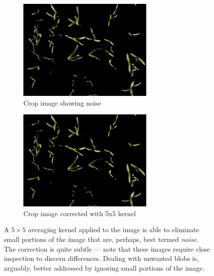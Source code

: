 \documentclass[letterpaper, notitlepage]{report}
\begin{document}
{\begin{figure}[h!]
	\centering
	\begin{subfigure}[h]{.48\textwidth}
	  \centering
	  \includegraphics[height=5cm]{./figures/image-cleanup-before.jpg}
	  \caption{Crop image showing noise}
	  \label{fig:mask-raw}
	\end{subfigure}
	\hfill
	\begin{subfigure}[h]{.48\textwidth}
	  \centering
	  \includegraphics[height=5cm]{./figures/image-cleanup-after.jpg}
	  \caption{Crop image corrected with 5x5 kernel}
	  \label{fig:image-cleanup}
	\end{subfigure}
	\caption[A $5\times5$ averaging kernel applied to image]{A $5\times5$ averaging kernel applied to the image is able to eliminate small portions of the image that are, perhaps, best termed \textit{noise}. The correction is quite subtle --- note that these images require close inspection to discern differences. Dealing with unwanted blobs is, arguably, better addressed by ignoring small portions of the image.}
	\label{fig:mask-before-and-after}
\end{figure}

}
\end{document}
